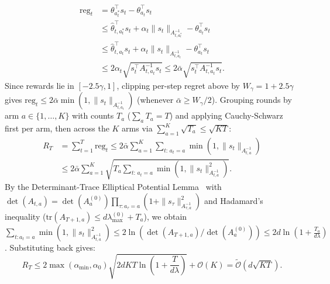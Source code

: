 \documentclass[10pt,twocolumn,letterpaper]{article}
\begin{document}
\begin{align}
\text{reg}_t &= \theta_{a_t^*}^\top s_t - \theta_{a_t}^\top s_t \nonumber\\
&\le \hat{\theta}_{t,a_t^*}^\top s_t + \alpha_t \|s_t\|_{A_{t,a_t^*}^{-1}} - \theta_{a_t}^\top s_t \nonumber\\
&\le \hat{\theta}_{t,a_t}^\top s_t + \alpha_t \|s_t\|_{A_{t,a_t}^{-1}} - \theta_{a_t}^\top s_t \nonumber\\
&\le 2 \alpha_t \sqrt{s_t^\top A_{t,a_t}^{-1} s_t} \le 2 \bar{\alpha} \sqrt{s_t^\top A_{t,a_t}^{-1} s_t}.
\end{align}
Since rewards lie in $[-2.5\gamma, 1]$, clipping per-step regret above by $W_\gamma = 1+2.5\gamma$ gives $\text{reg}_t \le 2\bar{\alpha} \min(1, \|s_t\|_{A_{t,a_t}^{-1}})$ (whenever $\bar{\alpha} \ge W_\gamma/2$). Grouping rounds by arm $a \in \{1,\dots,K\}$ with counts $T_a$ ($\sum_a T_a = T$) and applying Cauchy-Schwarz first per arm, then across the $K$ arms via $\sum_{a=1}^K \sqrt{T_a} \le \sqrt{K T}$:
\begin{align}
R_T &= \sum_{t=1}^T \text{reg}_t \le 2\bar{\alpha} \sum_{a=1}^K \sum_{t:\, a_t = a} \min\!\left(1, \|s_t\|_{A_{t,a}^{-1}}\right) \nonumber\\
&\le 2\bar{\alpha} \sum_{a=1}^K \sqrt{T_a \sum_{t:\, a_t = a} \min\!\left(1, \|s_t\|_{A_{t,a}^{-1}}^2\right)}.
\end{align}
By the Determinant-Trace Elliptical Potential Lemma~\citep{abbasi2011improved} with $\det(A_{t,a}) = \det(A_a^{(0)}) \prod_{\tau: a_\tau = a}(1 + \|s_\tau\|_{A_{\tau,a}^{-1}}^2)$ and Hadamard's inequality ($\text{tr}(A_{T+1,a}) \le d \lambda_{\max}^{(0)} + T_a$), we obtain $\sum_{t:a_t=a} \min(1, \|s_t\|_{A_{t,a}^{-1}}^2) \le 2 \ln(\det(A_{T+1,a})/\det(A_a^{(0)})) \le 2 d \ln(1 + \frac{T_a}{d\lambda})$. Substituting back gives:
\begin{equation}
R_T \le 2 \max(\alpha_{\min}, \alpha_0) \sqrt{2 d K T \ln\!\left(1 + \frac{T}{d\lambda}\right)} + \mathcal{O}(K) = \tilde{\mathcal{O}}(d\sqrt{KT}).
\end{equation}
\end{document}
